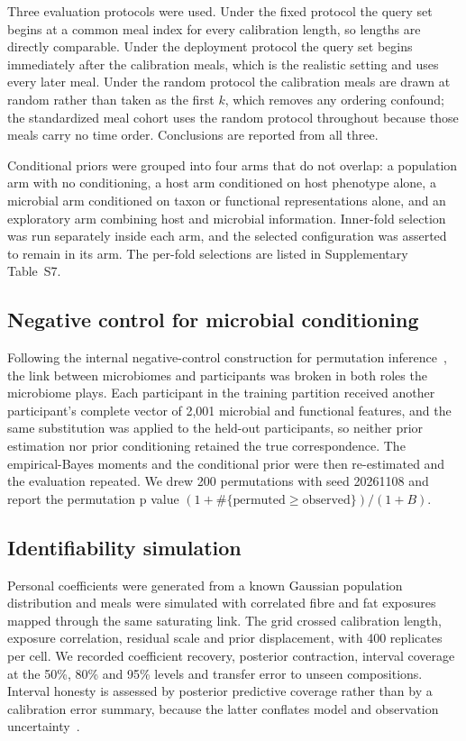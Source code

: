 \documentclass[pdflatex,sn-nature]{sn-jnl}
\theoremstyle{thmstyleone}
\theoremstyle{thmstyletwo}
\theoremstyle{thmstylethree}
\begin{document}
Three evaluation protocols were used. Under the fixed protocol the query set begins at a common
meal index for every calibration length, so lengths are directly comparable. Under the deployment
protocol the query set begins immediately after the calibration meals, which is the realistic
setting and uses every later meal. Under the random protocol the calibration meals are drawn at
random rather than taken as the first $k$, which removes any ordering confound; the standardized
meal cohort uses the random protocol throughout because those meals carry no time order.
Conclusions are reported from all three.

Conditional priors were grouped into four arms that do not overlap: a population arm with no
conditioning, a host arm conditioned on host phenotype alone, a microbial arm conditioned on
taxon or functional representations alone, and an exploratory arm combining host and microbial
information. Inner-fold selection was run separately inside each arm, and the selected
configuration was asserted to remain in its arm. The per-fold selections are listed in
Supplementary Table~S7.

\subsection{Negative control for microbial conditioning}

Following the internal negative-control construction for permutation inference~\cite{negcontrol2023},
the link between microbiomes and participants was broken in both roles the microbiome plays. Each
participant in the training partition received another participant's complete vector of 2,001
microbial and functional features, and the same substitution was applied to the held-out
participants, so neither prior estimation nor prior conditioning retained the true correspondence.
The empirical-Bayes moments and the conditional prior were then re-estimated and the evaluation
repeated. We drew 200 permutations with seed 20261108 and report the permutation p value
$(1+\#\{\text{permuted}\ge\text{observed}\})/(1+B)$.

\subsection{Identifiability simulation}

Personal coefficients were generated from a known Gaussian population distribution and meals were
simulated with correlated fibre and fat exposures mapped through the same saturating link. The
grid crossed calibration length, exposure correlation, residual scale and prior displacement, with
400 replicates per cell. We recorded coefficient recovery, posterior contraction, interval
coverage at the 50\%, 80\% and 95\% levels and transfer error to unseen compositions. Interval
honesty is assessed by posterior predictive coverage rather than by a calibration error summary,
because the latter conflates model and observation uncertainty~\cite{ppc2021}.
\end{document}
